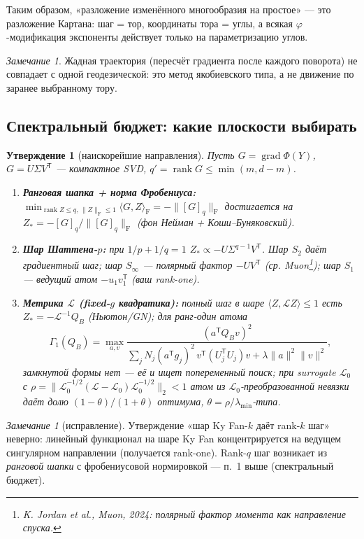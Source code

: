 \documentclass[11pt,a4paper]{article}
\newcommand{\T}{^{\mathsf T}}
\newcommand{\F}{_{\mathrm F}}
\newcommand{\ip}[2]{\langle #1,#2\rangle_{\mathrm F}}
\newcommand{\grad}{\operatorname{grad}}
\DeclareMathOperator{\rank}{rank}
\newtheorem{proposition}[theorem]{Утверждение}
\theoremstyle{remark}
\newtheorem{remark}[theorem]{Замечание}
\begin{document}
Таким образом, «разложение изменённого многообразия на простое» ---
это разложение Картана: шаг = тор, координаты тора = углы, а всякая
 $\varphi$-модификация экспоненты действует только на параметризацию углов.

\begin{remark}
Жадная траектория (пересчёт градиента после каждого поворота) не совпадает
с одной геодезической: это метод якобиевского типа, а не движение по
заранее выбранному тору.
\end{remark}

\subsection{Спектральный бюджет: какие плоскости выбирать}\label{sec:budget}

\begin{proposition}[наискорейшие направления]\label{prop:budget}
Пусть $G=\grad\Phi(Y)$, $G=U\Sigma V\T$ --- компактное SVD,
 $q'=\rank G\le\min(m,d-m)$.
\begin{enumerate}
\item \textbf{Ранговая шапка + норма Фробениуса:}
 $\min_{\rank Z\le q,\,\|Z\|\F\le1}\ip{G}{Z}=-\|[G]_q\|\F$ достигается на
 $Z_*=-[G]_q/\|[G]_q\|\F$ (фон Нейман + Коши--Буняковский).
\item \textbf{Шар Шаттена-$p$:} при $1/p+1/q=1$  $Z_*\propto-U\Sigma^{q-1}V\T$. Шар $S_2$ даёт градиентный шаг; шар
 $S_\infty$ --- полярный фактор $-UV\T$ (ср. Muon\footnote{K. Jordan et al.,
Muon, 2024: полярный фактор момента как направление спуска.});
шар $S_1$ --- ведущий атом $-u_1v_1\T$ (ваш rank-one).
\item \textbf{Метрика $\mathcal L$ (fixed-$g$ квадратика):} полный шаг в шаре
 $\langle Z,\mathcal LZ\rangle\le1$ есть $Z_*=-\mathcal L^{-1}Q_B$ (Ньютон/GN); для \emph{ранг-один} атома
\begin{equation}\label{eq:Lball}
 \Gamma_1(Q_B)=\max_{a,v}\frac{(a\T Q_Bv)^2}
 {\sum_jN_j(a\T g_j)^2\,v\T(U_j\T U_j)v+\lambda\|a\|^2\|v\|^2},
\end{equation}
замкнутой формы нет --- её и ищет попеременный поиск; при surrogate
 $\mathcal L_0$ с $\rho=\|\mathcal L_0^{-1/2}(\mathcal L-\mathcal L_0)
\mathcal L_0^{-1/2}\|_2<1$ атом из $\mathcal L_0$-преобразованной невязки
даёт долю $(1-\theta)/(1+\theta)$ оптимума, $\theta=\rho/\lambda_{\min}$-типа.
\end{enumerate}
\end{proposition}

\begin{remark}[исправление]\label{rem:kyfan}
Утверждение «шар Ky Fan-$k$ даёт rank-$k$ шаг» неверно: линейный функционал
на шаре Ky Fan концентрируется на ведущем сингулярном направлении
(получается rank-one). Rank-$q$ шаг возникает из \emph{ранговой шапки} с
фробениусовой нормировкой --- п.~1 выше (спектральный бюджет).
\end{remark}
\end{document}
